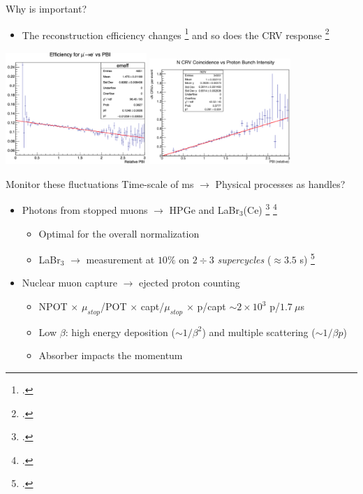 \documentclass[10pt]{beamer}
\begin{document}
\begin{frame}{Why is important?}
\begin{itemize}
\item The reconstruction efficiency changes \footcite{MDC2018:PBI} and so does the CRV response \footcite{MDC2018}
\end{itemize}
\begin{center}
\includegraphics[width=0.4\textwidth]{Dave_eff-vs-PBI}
\includegraphics[width=0.4\textwidth]{Dave_CRV-vs-PBI}
\end{center}
\end{frame}

%
\begin{frame}{Monitor these fluctuations}
Time-scale of ms $\rightarrow$ Physical processes as handles?
\vspace{0.3cm}
\begin{itemize}
\setlength\itemsep{0.5cm}
\item Photons from stopped muons $\rightarrow$ HPGe and LaBr$_3$(Ce) \footcite{STM:2016} \footcite{LaBr3:2020}\\
\begin{itemize}
\setlength\itemsep{0.2cm}
\item Optimal for the overall normalization\\
\item LaBr$_3$ $\rightarrow$ measurement at $10\%$ on $2\div3$ \textit{supercycles} ($\approx 3.5$ s) \footcite{LaBr3:2019}
\end{itemize}
\item Nuclear muon capture $\rightarrow$ ejected proton counting
\begin{itemize}
\setlength\itemsep{0.2cm}
\item NPOT $\times$ $\mu_{stop}$/POT $\times$ capt/$\mu_{stop}$ $\times$ p/capt $\sim 2\times10^3$ p/$1.7\ \mu$s\\
\item Low $\beta$: high energy deposition ($\sim 1/\beta^2$) and multiple scattering ($\sim 1/\beta p$)
\item Absorber impacts the momentum
\end{itemize}
\end{itemize}
\end{frame}
\end{document}
